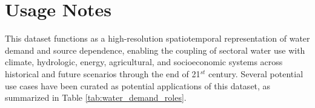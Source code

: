 \documentclass[fleqn,10pt]{wlscirep}
\begin{document}
\section*{Usage Notes}

This dataset functions as a high-resolution spatiotemporal representation of water demand and source dependence, enabling the coupling of sectoral water use with climate, hydrologic, energy, agricultural, and socioeconomic systems across historical and future scenarios through the end of 21$^{st}$ century. Several potential use cases have been curated as potential applications of this dataset, as summarized in Table \ref{tab:water_demand_roles}.

\end{document}
